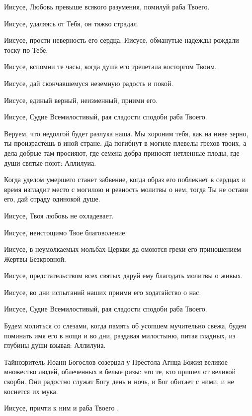 \begin{mymulticols}
Иисусе, Любовь превыше всякого разумения, помилуй раба Твоего. 

Иисусе, удаляясь от Тебя, он тяжко страдал. 

Иисусе, прости неверность его сердца. Иисусе, обманутые надежды рождали тоску по Тебе. 

Иисусе, вспомни те часы, когда душа его трепетала восторгом Твоим. 

Иисусе, дай скончавшемуся неземную радость и покой. 

Иисусе, единый верный, неизменный, приими его. 

Иисусе, Судие Всемилостивый, рая сладости сподоби раба Твоего.


Веруем, что недолгой будет разлука наша. Мы хороним тебя, как на ниве зерно, ты произрастешь в иной стране. Да погибнут в могиле плевелы грехов твоих, а дела добрые там просияют, где семена добра приносят нетленные плоды, где души святые поют: Аллилуиа.


Когда уделом умершего станет забвение, когда образ его поблекнет в сердцах и время изгладит место с могилою и ревность молитвы о нем, тогда Ты не остави его, дай отраду одинокой душе. 

Иисусе, Твоя любовь не охладевает. 

Иисусе, неистощимо Твое благоволение. 

Иисусе, в неумолкаемых мольбах Церкви да омоются грехи его приношением Жертвы Безкровной. 

Иисусе, предстательством всех святых даруй ему благодать молитвы о живых. 

Иисусе, во дни испытаний наших приими его ходатайство о нас. 

Иисусе, Судие Всемилостивый, рая сладости сподоби раба Твоего.


Будем молиться со слезами, когда память об усопшем мучительно свежа, будем поминать имя его в нощи и во дни, раздавая милостыню, питая гладных, из глубины души взывая: Аллилуиа.


Тайнозритель Иоанн Богослов созерцал у Престола Агнца Божия великое множество людей, облеченных в белые ризы: это те, кто пришел от великой скорби. Они радостно служат Богу день и ночь, и Бог обитает с ними, и не коснется их мука. 

Иисусе, причти к ним и раба Твоего . 


\end{mymulticols}
